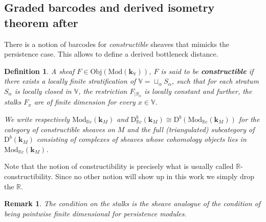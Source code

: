 \documentclass[a4paper, english, 11pt]{article}
\newcommand{\kk}[0]{\textbf{k}}
\newcommand{\Mod}[0]{\text{Mod}}
\newcommand{\0}{\vec{0}}
\newcommand{\R}[0]{\mathbb{R}}
\newcommand{\V}[0]{\mathbb{V}}
\newcommand{\D}[0]{\text{D}}
\newcommand{\Obj}[0]{\text{Obj}}
\newtheorem{remark}[prop]{Remark}
\newtheorem{defi}[prop]{Definition}
\begin{document}
\subsection{Graded barcodes and derived isometry theorem after~\cite{Berk18}}
There is a notion of barcodes for \emph{constructible} sheaves that mimicks the persistence case. This allows  to define a derived bottleneck distance.


\begin{defi}
A sheaf  $F\in \Obj(\Mod(\kk_\V))$, $F$ is said to be \textbf{constructible} if there exists a locally finite stratification of $\V = \sqcup_\alpha S_\alpha$, such that for each stratum $S_\alpha$ is locally closed in $\V$, the restriction $F_{|S_\alpha}$ is locally constant and further,  the stalks $F_x$ are of finite dimension for every $x\in \V$. 

We  write respectively $\Mod_{\R c}(\kk_M)$ and $\D^b_{\R c}(\kk_M)\cong \D^b(\Mod_{\R c}(\kk_M))$ for the  category of constructible sheaves on $M$ and  the full (triangulated) subcategory of $\D^b(\kk_M)$ consisting of complexes of sheaves whose cohomology objects lies in $\Mod_{\R c}(\kk_M)$.
\end{defi}
Note that the notion of constructibility is precisely what is usually called $\R$-constructibility. Since no other notion will show up in this work we simply drop the $\R$. 
\begin{remark} The condition on the stalks is the sheave analogue of the condition of being pointwise finite dimensional  for persistence modules.   
\end{remark}
\end{document}
